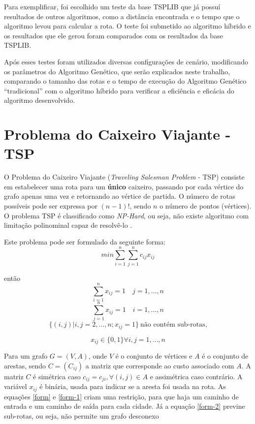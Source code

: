 \documentclass[12pt,openright,a4paper,oneside]{tcc}
\begin{document}
		Para exemplificar, foi escolhido um teste da base TSPLIB que já possuí resultados de outros algoritmos, como a distância encontrada e o tempo que o algoritmo levou para calcular a rota. O teste foi submetido ao algoritmo híbrido e os resultados que ele gerou foram comparados com os resultados da base TSPLIB.

		Após esses testes foram utilizados diversas configurações de cenário, modificando os parâmetros do Algoritmo Genético, que serão explicados neste trabalho, comparando o tamanho das rotas e o tempo de execução do Algoritmo Genético ``tradicional'' com o algoritmo híbrido para verificar a eficiência e eficácia do algoritmo desenvolvido. 

	
	\chapter{Problema do Caixeiro Viajante - TSP}
		O Problema do Caixeiro Viajante (\textit{Traveling Salesman Problem} - TSP) consiste em estabelecer uma rota para um \textbf{único} caixeiro, passando por cada vértice do grafo apenas uma vez e retornando ao vértice de partida. O número de rotas possíveis pode ser expressa por $(n-1)!$, sendo $n$ o número de pontos (vértices).
		O problema TSP é classificado como \textit{NP-Hard}\cite{0015-pdf}, ou seja, não existe algoritmo com limitação polinominal capaz de resolvê-lo \cite{0010-pdf}. 
		
		Este problema pode ser formulado da seguinte forma:
		\begin{equation}
 		   	min\sum_{i=1}^{n} \sum_{j=1}^{n} c_{ij} x_{ij}
		\end{equation}
		
		então		
		\begin{equation}
			\label{form}
 		   	\sum_{i=1}^{n} x_{ij} = 1 \quad j=1,\dots,n
		\end{equation}
		\begin{equation}
			\label{form-1}
 		   	\sum_{j=1}^{n} x_{ij} = 1 \quad i=1,\dots,n
		\end{equation}
		\begin{equation}
		\label{form-2}
 		   	\{(i,j)|i,j=2,\dots,n; x_{ij}=1\} ~\text{não contém sub-rotas,}
		\end{equation}
		
		\begin{equation}
		\label{form-3}
 		   	x_{ij} \in \{0,1\}\forall i,j=1,\dots,n
		\end{equation}
		
			
		Para um grafo  $G=(V,A)$, onde $V$ é o conjunto de vértices e $A$  é o conjunto de arestas, sendo $C = (C_{ij})$ a matriz que corresponde ao custo associado com $A$. A matriz $C$ é simétrica caso $c_{ij}=c_{ji},\forall(i,j) \in A$ e assimétrica caso contrário. A variável $x_{ij}$ é binária, usada para indicar se a aresta foi usada na rota. As equações \ref{form} e \ref{form-1} criam uma restrição, para que haja um caminho de entrada e um caminho de saída para cada cidade. Já a equação \ref{form-2} previne sub-rotas, ou seja, não permite um grafo desconexo \cite{dissertation}
	
\end{document}
